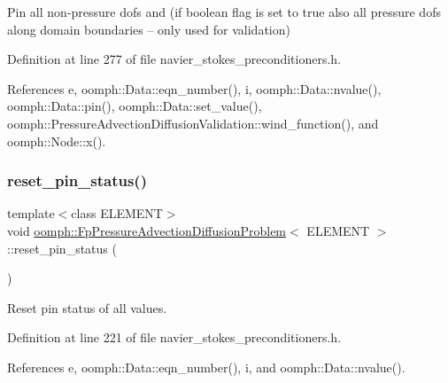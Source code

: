 Pin all non-\/pressure dofs and (if boolean flag is set to true also all pressure dofs along domain boundaries -- only used for validation) 



Definition at line 277 of file navier\+\_\+stokes\+\_\+preconditioners.\+h.



References e, oomph\+::\+Data\+::eqn\+\_\+number(), i, oomph\+::\+Data\+::nvalue(), oomph\+::\+Data\+::pin(), oomph\+::\+Data\+::set\+\_\+value(), oomph\+::\+Pressure\+Advection\+Diffusion\+Validation\+::wind\+\_\+function(), and oomph\+::\+Node\+::x().

\mbox{\label{classoomph_1_1FpPressureAdvectionDiffusionProblem_ad7d514f813007a3b381a2eb7a930f19e}} 
\subsubsection{\texorpdfstring{reset\+\_\+pin\+\_\+status()}{reset\_pin\_status()}}
{\footnotesize\ttfamily template$<$class E\+L\+E\+M\+E\+NT$>$ \\
void \hyperlink{classoomph_1_1FpPressureAdvectionDiffusionProblem}{oomph\+::\+Fp\+Pressure\+Advection\+Diffusion\+Problem}$<$ E\+L\+E\+M\+E\+NT $>$\+::reset\+\_\+pin\+\_\+status (\begin{DoxyParamCaption}{ }\end{DoxyParamCaption})\hspace{0.3cm}{\ttfamily [inline]}}



Reset pin status of all values. 



Definition at line 221 of file navier\+\_\+stokes\+\_\+preconditioners.\+h.



References e, oomph\+::\+Data\+::eqn\+\_\+number(), i, and oomph\+::\+Data\+::nvalue().

\mbox{\label{classoomph_1_1FpPressureAdvectionDiffusionProblem_ae24eef02cff52b57dca6c1daf274bab2}} 
